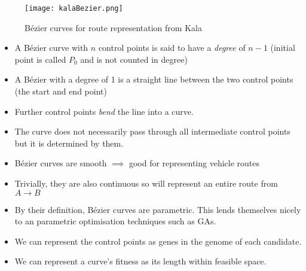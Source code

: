 \documentclass{beamer}
\begin{document}
\begin{frame}

    \begin{figure}[KalaBezier]
        \centering
        \texttt{[image: kalaBezier.png]}
        \caption{Bézier curves for route representation from Kala \cite{kalaOnroadIntelligentVehicles2016}}%
        \label{fig:.ext}
    \end{figure}

    \begin{itemize}
        \item A Bézier curve with $n$ control points is said to have a \textit{degree} of $n-1$ (initial point is called $P_0$ and is not counted in degree)
        \item A Bézier with a degree of 1 is a straight line between the two control points (the start and end point)
        \item Further control points \textit{bend} the line into a curve.
        \item The curve does not necessarily pass through all intermediate control points but it is determined by them.
        \item Bézier curves are smooth $\implies$ good for representing vehicle routes
        \item Trivially, they are also continuous so will represent an entire route from $A \rightarrow B$ 
    \end{itemize}
\end{frame}

\begin{frame}
    \begin{itemize}
        \item By their definition, Bézier curves are parametric. This lends themselves nicely to an parametric optimisation techniques such as GAs.
        \item We can represent the control points as genes in the genome of each candidate.
        \item We can represent a curve's fitness as its length within feasible space.
    \end{itemize}
\end{frame}
\end{document}
